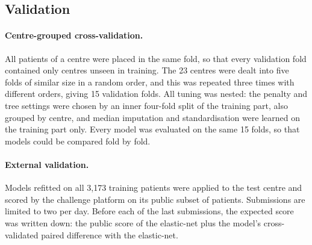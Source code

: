 \documentclass[10pt,letterpaper]{article}
\begin{document}
\subsection*{Validation}
\paragraph*{Centre-grouped cross-validation.} All patients of a centre were placed in the
same fold, so that every validation fold contained only centres unseen in training. The 23
centres were dealt into five folds of similar size in a random order, and this was repeated
three times with different orders, giving 15 validation folds. All tuning was nested: the
penalty and tree settings were chosen by an inner four-fold split of the training part,
also grouped by centre, and median imputation and standardisation were learned on the
training part only. Every model was evaluated on the same 15 folds, so that models could be
compared fold by fold.

\paragraph*{External validation.} Models refitted on all 3,173 training patients were
applied to the test centre and scored by the challenge platform on its public subset of
patients. Submissions are limited to two per day. Before each of the last submissions, the
expected score was written down: the public score of the elastic-net plus the model's
cross-validated paired difference with the elastic-net.
\end{document}

